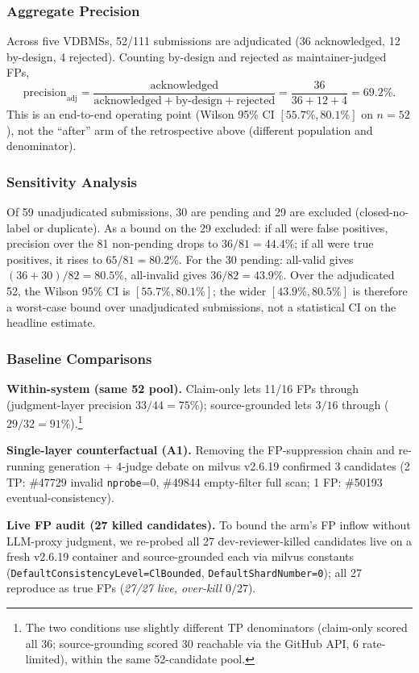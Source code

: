 \documentclass[sigconf]{acmart}
\begin{document}
\subsubsection{Aggregate Precision}
Across five VDBMSs, 52/111 submissions are adjudicated (36 acknowledged, 12 by-design, 4 rejected). Counting by-design and rejected as maintainer-judged FPs,
\[
\mathrm{precision}_{\mathrm{adj}} = \frac{\mathrm{acknowledged}}{\mathrm{acknowledged}+\mathrm{by\text{-}design}+\mathrm{rejected}} = \frac{36}{36+12+4} = 69.2\%.
\]
This is an end-to-end operating point (Wilson 95\% CI $[55.7\%, 80.1\%]$ on $n{=}52$), not the ``after'' arm of the retrospective above (different population and denominator).

\subsubsection{Sensitivity Analysis}
Of 59 unadjudicated submissions, 30 are pending and 29 are excluded (closed-no-label or duplicate). As a bound on the 29 excluded: if all were false positives, precision over the 81 non-pending drops to $36/81{=}44.4\%$; if all were true positives, it rises to $65/81{=}80.2\%$. For the 30 pending: all-valid gives $(36{+}30)/82=80.5\%$, all-invalid gives $36/82=43.9\%$. Over the adjudicated 52, the Wilson 95\% CI is $[55.7\%, 80.1\%]$; the wider $[43.9\%, 80.5\%]$ is therefore a worst-case bound over unadjudicated submissions, not a statistical CI on the headline estimate.

\subsubsection{Baseline Comparisons}
\textbf{Within-system (same 52 pool).} Claim-only lets 11/16 FPs through (judgment-layer precision $33/44=75\%$); source-grounded lets $3/16$ through ($29/32=91\%$).\footnote{The two conditions use slightly different TP denominators (claim-only scored all 36; source-grounding scored 30 reachable via the GitHub API, 6 rate-limited), within the same 52-candidate pool.}

\textbf{Single-layer counterfactual (A1).} Removing the FP-suppression chain and re-running generation + 4-judge debate on milvus v2.6.19 confirmed 3 candidates (2 TP: \#47729 invalid \texttt{nprobe}=0, \#49844 empty-filter full scan; 1 FP: \#50193 eventual-consistency).

\textbf{Live FP audit (27 killed candidates).} To bound the arm's FP inflow without LLM-proxy judgment, we re-probed all 27 dev-reviewer-killed candidates live on a fresh v2.6.19 container and source-grounded each via milvus constants (\texttt{DefaultConsistencyLevel=ClBounded}, \texttt{DefaultShardNumber=0}); all 27 reproduce as true FPs (\emph{27/27 live, over-kill $0/27$}).
\end{document}
